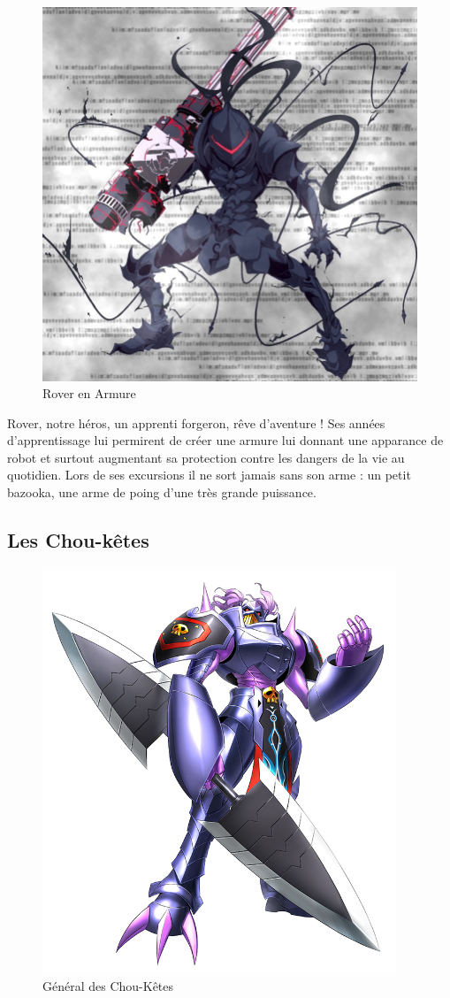 \documentclass[a4paper 12pts]{article}
\begin{document}
\begin{figure}[h]
  	\includegraphics[width=350pt]{Illustration/Rover.jpg}
	\caption{Rover en Armure}
\end{figure}


Rover, notre héros, un apprenti forgeron, rêve d'aventure ! Ses années d'apprentissage lui permirent de créer une armure lui donnant une apparance de robot et surtout augmentant sa protection contre les dangers de la vie au quotidien.
Lors de ses excursions il ne sort jamais sans son arme : un petit bazooka, une arme de poing d'une très grande puissance.


\subsection{Les Chou-kêtes}
\vspace{1cm}


\begin{figure}[h]
  	\includegraphics[width=300pt]{Illustration/Badboy.jpg}
	\caption{Général des Chou-Kêtes}
\end{figure}
\end{document}
